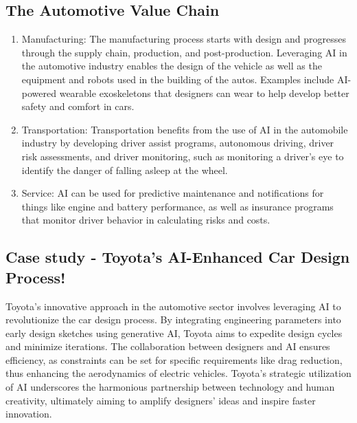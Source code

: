 \documentclass[
]{article}
\begin{document}
\hypertarget{the-automotive-value-chain}{%
\subsection{The Automotive Value Chain}\label{the-automotive-value-chain}}

\begin{enumerate}
\def\labelenumi{\arabic{enumi}.}
\item
  Manufacturing: The manufacturing process starts with design and progresses through the supply chain, production, and post-production. Leveraging AI in the automotive industry enables the design of the vehicle as well as the equipment and robots used in the building of the autos. Examples include AI-powered wearable exoskeletons that designers can wear to help develop better safety and comfort in cars.
\item
  Transportation: Transportation benefits from the use of AI in the automobile industry by developing driver assist programs, autonomous driving, driver risk assessments, and driver monitoring, such as monitoring a driver's eye to identify the danger of falling asleep at the wheel.
\item
  Service: AI can be used for predictive maintenance and notifications for things like engine and battery performance, as well as insurance programs that monitor driver behavior in calculating risks and costs.
\end{enumerate}

\hypertarget{case-study---toyotas-ai-enhanced-car-design-process}{%
\subsection{Case study - Toyota's AI-Enhanced Car Design Process!}\label{case-study---toyotas-ai-enhanced-car-design-process}}

Toyota's innovative approach in the automotive sector involves leveraging AI to revolutionize the car design process. By integrating engineering parameters into early design sketches using generative AI, Toyota aims to expedite design cycles and minimize iterations. The collaboration between designers and AI ensures efficiency, as constraints can be set for specific requirements like drag reduction, thus enhancing the aerodynamics of electric vehicles. Toyota's strategic utilization of AI underscores the harmonious partnership between technology and human creativity, ultimately aiming to amplify designers' ideas and inspire faster innovation.
\end{document}
